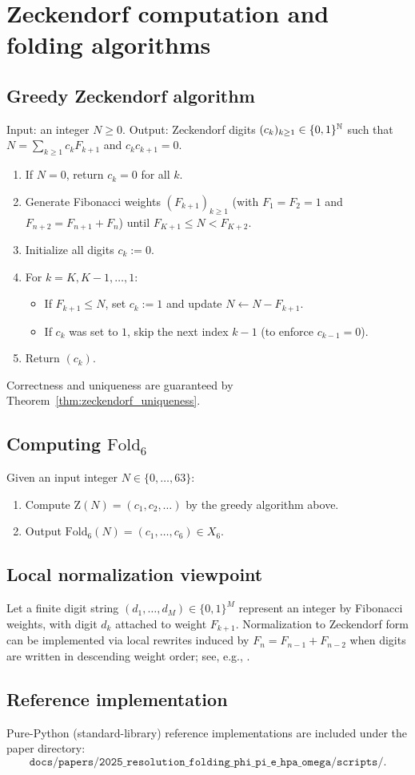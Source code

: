 
\section{Zeckendorf computation and folding algorithms}
\label{app:zeckendorf_algorithms}

\subsection{Greedy Zeckendorf algorithm}
Input: an integer $N\ge 0$.
Output: Zeckendorf digits $(c_k)_{k\ge 1}\in\{0,1\}^{\mathbb{N}}$ such that $N=\sum_{k\ge 1} c_k F_{k+1}$ and $c_k c_{k+1}=0$.

\begin{enumerate}
\item If $N=0$, return $c_k=0$ for all $k$.
\item Generate Fibonacci weights $(F_{k+1})_{k\ge 1}$ (with $F_1=F_2=1$ and $F_{n+2}=F_{n+1}+F_n$) until $F_{K+1}\le N < F_{K+2}$.
\item Initialize all digits $c_k:=0$.
\item For $k=K,K-1,\dots,1$:
  \begin{itemize}
  \item If $F_{k+1}\le N$, set $c_k:=1$ and update $N\leftarrow N-F_{k+1}$.
  \item If $c_k$ was set to $1$, skip the next index $k-1$ (to enforce $c_{k-1}=0$).
  \end{itemize}
\item Return $(c_k)$.
\end{enumerate}

Correctness and uniqueness are guaranteed by Theorem~\ref{thm:zeckendorf_uniqueness}.

\subsection{Computing \texorpdfstring{$\mathrm{Fold}_6$}{Fold\_6}}
Given an input integer $N\in\{0,\dots,63\}$:
\begin{enumerate}
\item Compute $\mathrm{Z}(N)=(c_1,c_2,\dots)$ by the greedy algorithm above.
\item Output $\mathrm{Fold}_6(N)=(c_1,\dots,c_6)\in X_6$.
\end{enumerate}

\subsection{Local normalization viewpoint}
Let a finite digit string $(d_1,\dots,d_M)\in\{0,1\}^M$ represent an integer by Fibonacci weights, with digit $d_k$ attached to weight $F_{k+1}$.
Normalization to Zeckendorf form can be implemented via local rewrites induced by $F_n=F_{n-1}+F_{n-2}$ when digits are written in descending weight order; see, e.g., \cite{AlloucheShallit2003}.

\subsection{Reference implementation}
Pure-Python (standard-library) reference implementations are included under the paper directory:
\[
\texttt{docs/papers/2025\_resolution\_folding\_phi\_pi\_e\_hpa\_omega/scripts/}.
\]


